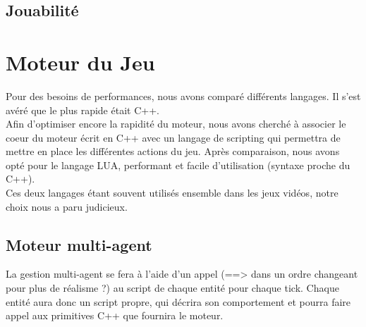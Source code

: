 \documentclass[a4paper]{article}
\begin{document}
      \subsection{Jouabilité}



    \section{Moteur du Jeu}
      Pour des besoins de performances, nous avons comparé différents langages. Il s'est avéré que le plus rapide était C++.\\
      Afin d'optimiser encore la rapidité du moteur, nous avons cherché à associer le coeur du moteur écrit en C++ avec un langage de scripting qui permettra de mettre en place les différentes actions du jeu. Après comparaison, nous avons opté pour le langage LUA, performant et facile d'utilisation (syntaxe proche du C++).\\
      Ces deux langages étant souvent utilisés ensemble dans les jeux vidéos, notre choix nous a paru judicieux.

      \subsection{Moteur multi-agent}
        La gestion multi-agent se fera à l'aide d'un appel (==> dans un ordre changeant pour plus de réalisme ?) au script de chaque entité pour chaque tick. Chaque entité aura donc un script propre, qui décrira son comportement et pourra faire appel aux primitives C++ que fournira le moteur.
\end{document}
